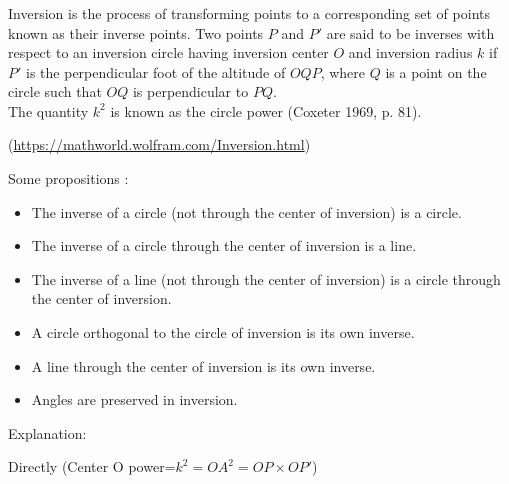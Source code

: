 \subsubsection{}

Inversion is the process of transforming points to a corresponding set of points known as their inverse points. Two points $P$ and $P'$ are said to be inverses with respect to an inversion circle having inversion center $O$ and inversion radius $k$ if $P'$ is the perpendicular foot of the altitude of $OQP$, where  $Q$ is a point on the circle such that $OQ$ is perpendicular to $PQ$.\\
 The quantity $k^2$ is known as the circle power (Coxeter 1969, p. 81).
 
(\url{https://mathworld.wolfram.com/Inversion.html})

Some propositions :
\begin{itemize}
\item The inverse of a circle (not through the center of inversion) is a circle.
\item The inverse of a circle through the center of inversion is a line.
\item The inverse of a line (not through the center of inversion) is a circle through the center of inversion.
\item A circle orthogonal to the circle of inversion is its own inverse.
\item A line through the center of inversion is its own inverse.
\item Angles are preserved in inversion.
\end{itemize}

Explanation:

Directly 
(Center O power=$k^2={OA}^2=OP \times OP'$)

\begin{tkzexample}[latex=6cm,small]
\end{tkzexample} 

